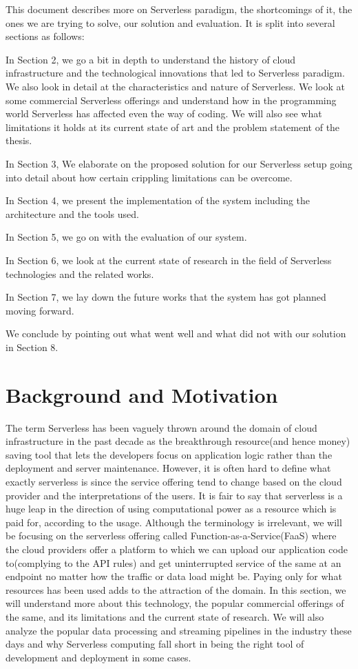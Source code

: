 \documentclass[12pt,titlepage]{article}
\begin{document}
This document describes more on Serverless paradigm, the shortcomings of it, the
ones we are trying to solve, our solution and evaluation. It is split into
several sections as follows:

In Section 2, we go a bit in depth to understand the history of cloud
infrastructure and the technological innovations that led to Serverless
paradigm. We also look in detail at the characteristics and nature of
Serverless. We look at some commercial Serverless offerings and understand how
in the programming world Serverless has affected even the way of coding.
We will also see what limitations it holds at its current state of art and
the problem statement of the thesis.

In Section 3, We elaborate on the proposed solution for our Serverless setup going
into detail about how certain crippling limitations can be overcome.

In Section 4, we present the implementation of the system including the architecture and
the tools used.

In Section 5, we go on with the evaluation of our system.

In Section 6, we look at the current state of research in the field of
Serverless technologies and the related works.

In Section 7, we lay down the future works that the system has got planned
moving forward.

We conclude by pointing out what went well and what did not with our solution in
Section 8.

\section{Background and Motivation}
\label{sec:org45fae5e}
The term Serverless has been vaguely thrown around the domain of cloud
infrastructure in the past decade as the breakthrough resource(and hence money)
saving tool that lets the developers focus on application logic rather than the
deployment and server maintenance. However, it is often hard to define
what exactly serverless is since the service offering tend to change based on
the cloud provider and the interpretations of the users. It is fair to say that
serverless is a huge leap in the direction of using computational power as a
resource which is paid for, according to the usage.
Although the terminology is irrelevant, we will be focusing on the serverless
offering called Function-as-a-Service(FaaS) where the cloud providers offer a
platform to which we can upload our application code to(complying to the API
rules) and get uninterrupted service of the same at an endpoint no matter how
the traffic or data load might be. Paying only for what resources has been used adds to
the attraction of the domain.
In this section, we will understand more about this technology, the
popular commercial offerings of the same, and its limitations and the current state
of research.
We will also analyze the popular data processing and streaming pipelines in the
industry these days and why Serverless computing fall short in being the right
tool of development and deployment in some cases.
\end{document}
